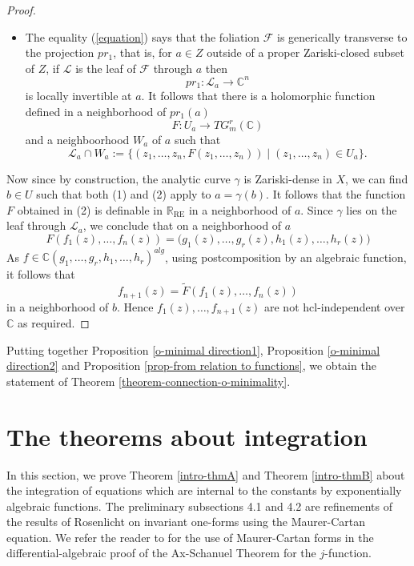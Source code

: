 \documentclass[12pt]{amsart}
\theoremstyle{definition}
\theoremstyle{plain}
\theoremstyle{exampstyle}\newtheorem{thmx}{Theorem}
\theoremstyle{exampstyle}\newtheorem{thmxbis}{Theorem}
\begin{document}
\begin{proof}
\begin{itemize}
\item[(2)] The equality (\ref{equation}) says that the foliation $\mathcal F$ is generically transverse to the projection $pr_1$, that is, for $a \in Z$ outside of a proper Zariski-closed subset of $Z$, if $\mathcal L$ is the leaf of $\mathcal F$ through $a$ then 
$$ pr_1 : \mathcal L_a \rightarrow \mathbb{C}^n $$
is locally invertible at $a$. It follows that there is a holomorphic function defined in a neighborhood of $pr_1(a)$ 
$$ F: U_a \rightarrow TG_m^r(\mathbb{C}) $$ and a neighboorhood $W_a$ of $a$ such that  
$$\mathcal L_a \cap W_a := \lbrace (z_1,\ldots,z_n, F(z_1,\ldots,z_n)) \mid (z_1,\ldots,z_n) \in U_a \rbrace.$$
\end{itemize}

Now since by construction, the analytic curve $\gamma$ is Zariski-dense in $X$, we can find $b \in U$ such that both (1) and (2) apply to $a = \gamma(b)$. It follows that the function $F$ obtained in (2) is definable in $\mathbb{R}_{\mathrm{RE}}$ in a neighborhood of $a$. Since $\gamma$ lies on the leaf through $\mathcal L_a$, we conclude that on a neighborhood of $a$
$$ F(f_1(z),\ldots,f_n(z)) = \Big( g_1(z),\ldots, g_r(z),h_1(z),\ldots, h_r(z) \Big) $$
As $f \in \mathbb{C}(g_1,\ldots,g_r,h_1,\ldots,h_r)^{alg}$, using postcomposition by an algebraic function, it follows that $$f_{n+1}(z) = \tilde{F}(f_1(z),\ldots, f_n(z))$$
in a neighborhood of $b$. Hence $f_1(z),\ldots, f_{n+1}(z)$ are not hcl-independent over $\mathbb{C}$ as required.
\end{proof} 



Putting together Proposition \ref{o-minimal direction1},  Proposition \ref{o-minimal direction2} and Proposition \ref{prop-from relation to functions}, we obtain the statement of Theorem \ref{theorem-connection-o-minimality}.



\section{The theorems about integration}
In this section, we prove Theorem \ref{intro-thmA} and Theorem \ref{intro-thmB} about the integration of equations which are internal to the constants by exponentially algebraic functions. The preliminary subsections 4.1 and 4.2 are refinements of the results of Rosenlicht \cite{Rosenlicht} on invariant one-forms using the Maurer-Cartan equation. We refer the reader to \cite{BCFN} for the use of Maurer-Cartan forms in the differential-algebraic proof of the Ax-Schanuel Theorem for the $j$-function.
\end{document}
